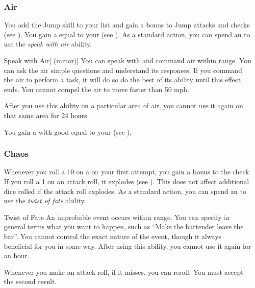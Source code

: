         \subsubsection{Air}
             You add the Jump skill to your  list and gain a  bonus to Jump attacks and checks (see ).
             You gain a  equal to your  (see ).
             As a standard action, you can spend an  to use the \textit{speak with air} ability.
            \begin{ability}{Speak with Air}[ (minor)]
                You can speak with and command air within \rnglong range.
                You can ask the air simple questions and understand its responses.
                If you command the air to perform a task, it will do so do the best of its ability until this effect ends.
                You cannot compel the air to move faster than 50 mph.

                After you use this ability on a particular area of air, you cannot use it again on that same area for 24 hours.
            \end{ability}
             You gain a  with good  equal to your  (see ).

        \subsubsection{Chaos}
             Whenever you roll a 10 on a  on your first attempt, you gain a  bonus to the check.
             If you roll a 1 on an attack roll, it explodes (see ).
            This does not affect additional dice rolled if the attack roll explodes.
             As a standard action, you can spend an  to use the \textit{twist of fate} ability.
            \begin{ability}{Twist of Fate}
                An improbable event occurs within \rnglong range.
                You can specify in general terms what you want to happen, such as ``Make the bartender leave the bar''.
                You cannot control the exact nature of the event, though it always beneficial for you in some way.
                After using this ability, you cannot use it again for an hour.
            \end{ability}
             Whenever you make an attack roll, if it misses, you can reroll.
            You must accept the second result.


